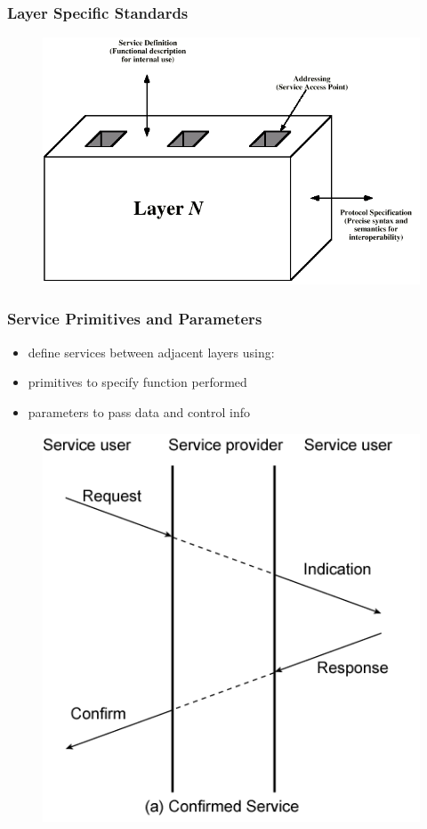 \documentclass[pdflatex,compress]{beamer}
\begin{document}
\begin{frame}
	\frametitle{Layer Specific Standards}
	\begin{figure}
		\centering
		\includegraphics[width=\textheight]{img/img11}
	\end{figure}
\end{frame}

\begin{frame}
	\frametitle{Service Primitives and Parameters}
	\begin{multicols}{2}
		\begin{itemize}
			\item define services between adjacent layers using:
			\item primitives to specify function performed
			\item parameters to pass data and control info
		\end{itemize}
		\columnbreak
		\begin{figure}
			\centering
			\includegraphics[width=\linewidth]{img/img12}
		\end{figure}
	\end{multicols}
\end{frame}
\end{document}
